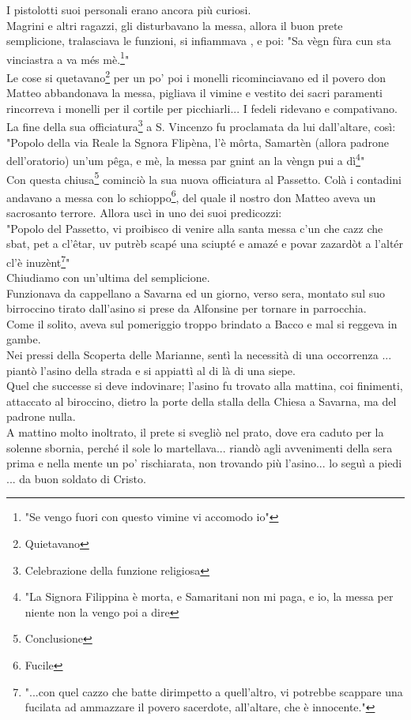 \documentclass[10pt]{memoir} %
\begin{document}
I pistolotti suoi personali erano ancora più curiosi.\\
Magrini e altri ragazzi, gli disturbavano la messa, allora il buon prete semplicione, tralasciava le funzioni, si infiammava , e poi: "Sa vègn fùra cun sta vinciastra a va més mè.\footnote{"Se vengo fuori con questo vimine vi accomodo io"}"\\
Le cose si quetavano\footnote{Quietavano} per un po' poi i monelli ricominciavano ed il povero don Matteo abbandonava la messa, pigliava il vimine e vestito dei sacri paramenti rincorreva i monelli per il cortile per picchiarli... I fedeli ridevano e compativano. \\
La fine della sua officiatura\footnote{Celebrazione della funzione religiosa} a S. Vincenzo fu proclamata da lui dall'altare, così:\\
"Popolo della via Reale la Sgnora Flipèna, l'è môrta, Samartèn (allora padrone dell'oratorio) un'um pêga, e mè, la messa par gnint an la vèngn pui a dì\footnote{"La Signora Filippina è morta, e Samaritani non mi paga, e io, la messa per niente non la vengo poi a dire}"\\
Con questa chiusa\footnote{Conclusione} cominciò la sua nuova officiatura al Passetto. Colà i contadini andavano a messa con lo schioppo\footnote{Fucile}, del quale il nostro don Matteo aveva un sacrosanto terrore. Allora uscì in uno dei suoi predicozzi:\\
"Popolo del Passetto, vi proibisco di venire alla santa messa c'un che cazz che sbat, pet a cl'êtar, uv putrèb scapé una sciupté e amazé e povar zazardòt a l'altér cl'è inuzènt\footnote{"...con quel cazzo che batte dirimpetto a quell'altro, vi potrebbe scappare una fucilata ad ammazzare il povero sacerdote, all'altare, che è innocente."}"\\
Chiudiamo con un'ultima del semplicione.\\Funzionava da cappellano a Savarna ed un giorno, verso sera, montato sul suo birroccino tirato dall'asino si prese da Alfonsine per tornare in parrocchia. \\
Come il solito, aveva sul pomeriggio troppo brindato a Bacco e mal si reggeva in gambe.\\
Nei pressi della Scoperta delle Marianne, sentì la necessità di una occorrenza ... piantò l'asino della strada e si appiattì al di là di una siepe.\\
Quel che successe si deve indovinare; l'asino fu trovato alla mattina, coi finimenti, attaccato al biroccino, dietro la porte della stalla della Chiesa a Savarna, ma del padrone nulla.\\
A mattino molto inoltrato, il prete si svegliò nel prato, dove era caduto per la solenne sbornia, perché il sole lo martellava... riandò agli avvenimenti della sera prima e nella mente un po' rischiarata, non trovando più l'asino... lo seguì a piedi ... da buon soldato di Cristo.
\end{document}
